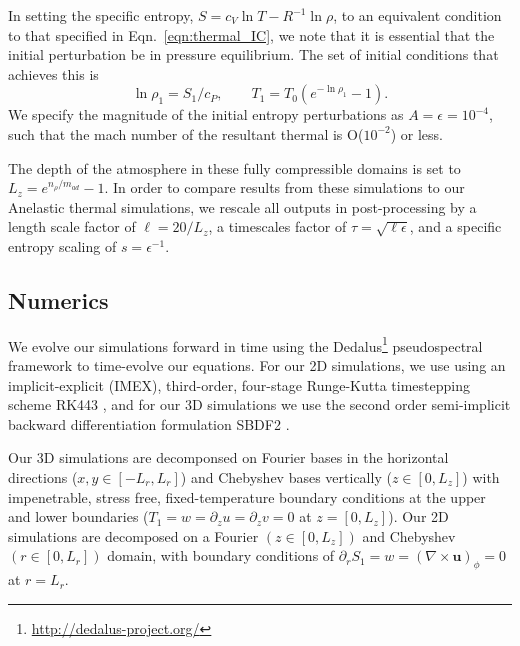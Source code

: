 \documentclass[twocolumn, amsmath, amsfonts, amssymb, trackchanges]{aastex62}
\newcommand{\grad}{\ensuremath{\nabla}}
\begin{document}
In setting the specific entropy, $S = c_V \ln T - R^{-1}\ln\rho$, to an equivalent condition to that specified in  Eqn.~\ref{eqn:thermal_IC}, we note that it is essential that the initial perturbation be in pressure equilibrium. 
The set of initial conditions that achieves this is
\begin{equation}
\ln\rho_1 = S_1/c_P, \qquad T_1 = T_0(e^{-\ln\rho_1} - 1).
\end{equation}
We specify the magnitude of the initial entropy perturbations as $A = \epsilon = 10^{-4}$, such that the mach number of the resultant thermal is O($10^{-2}$) or less.

The depth of the atmosphere in these fully compressible domains is set to $L_z = e^{n_\rho/m_{ad}} - 1$.
In order to compare results from these simulations to our Anelastic thermal simulations, we rescale all outputs in post-processing by a length scale factor of $\ell = 20/L_z$, a timescales factor of  $\tau = \sqrt{\ell \epsilon}$, and a specific entropy scaling of $s = \epsilon^{-1}$.

\subsection{Numerics}
We evolve our simulations forward in time using the  Dedalus\footnote{\url{http://dedalus-project.org/}} pseudospectral framework \citep{burns&all2016} to time-evolve our equations. 
For our 2D simulations, we use using an implicit-explicit (IMEX), third-order, four-stage Runge-Kutta timestepping scheme RK443 \citep{ascher&all1997}, and for our 3D simulations we use the second order semi-implicit backward differentiation formulation SBDF2 \citep{wang&ruuth2008}.

Our 3D simulations are decomponsed on Fourier bases in the horizontal directions ($x, y \in [-L_r, L_r]$) and Chebyshev bases vertically ($z \in [0, L_z]$) with impenetrable, stress free, fixed-temperature boundary conditions at the upper and lower boundaries ($T_1 = w = \partial_z u = \partial_z v = 0$ at $z = [0, L_z]$).
Our 2D simulations are decomposed on a Fourier $(z \in [0, L_z])$ and Chebyshev $(r \in [0, L_r])$ domain, with boundary conditions of $\partial_r S_1 = w = (\grad\times\bm{u})_{\phi} = 0$ at $r = L_r$.
\end{document}
